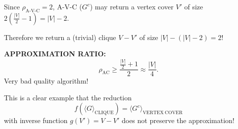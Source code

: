 Since $\rho_{\mathrm{A\text{-}V\text{-}C}}=2$, A-V-C ($G^c$) may return a vertex cover $V'$ of size $2\left(\frac{|V|}{2}-1\right)=|V|-2$.

Therefore we return a (trivial) clique $V-V'$ of size $|V|-(|V|-2)=2$!

\textbf{APPROXIMATION RATIO:}
\[\rho_{\mathrm{AC}}\geq\frac{\frac{|V|}{2}+1}{2}\approx\frac{|V|}{4}.\]
Very bad quality algorithm!

This is a clear example that the reduction
\[f(\langle G\rangle_{\mathrm{CLIQUE}})=\langle G^c\rangle_{\mathrm{VERTEX\ COVER}}\]
with inverse function $g(V')=V-V'$ does not preserve the approximation!
